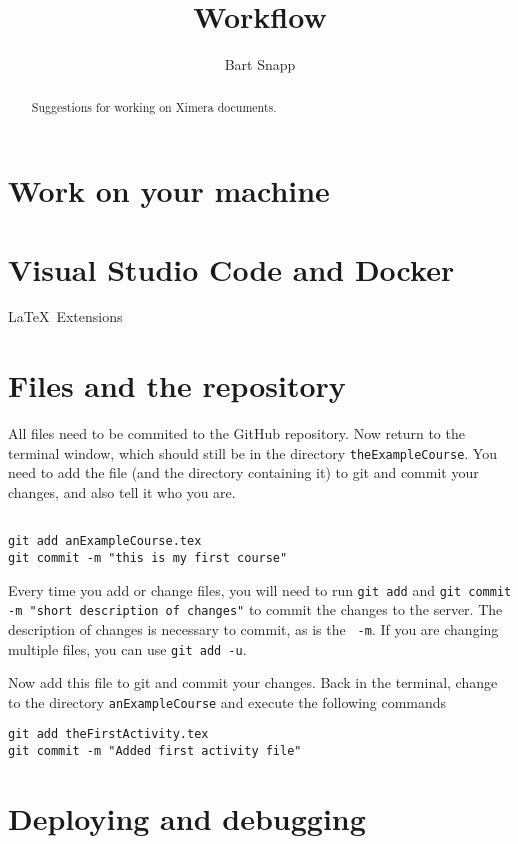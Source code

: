 \documentclass{ximera}
\title{Workflow}
\author{Bart Snapp}
\begin{document}
\begin{abstract}
    Suggestions for working on Ximera documents.
\end{abstract}
\maketitle

\section{Work on your machine}



\section{Visual Studio Code and Docker}

\LaTeX\ Extensions



\section{Files and the repository}

All files need to be commited to the GitHub repository.
Now return to the terminal window, which should still be in the
directory
\verb!theExampleCourse!. You need to add the file (and the directory
containing
it) to git and commit your changes, and also tell it who you are.
\begin{verbatim}

git add anExampleCourse.tex
git commit -m "this is my first course"
\end{verbatim}

Every time you add or change files, you will need to run \verb!git add!
and
\verb!git commit -m "short description of changes"! to commit the
changes to
the server. The description of changes is necessary to commit, as is
the
\verb! -m!. If you are changing multiple files, you can use
\verb!git add -u!.



Now add this file to git and commit your changes. Back in the terminal,
change to the directory \verb!anExampleCourse!
and execute the following commands
\begin{verbatim}
git add theFirstActivity.tex
git commit -m "Added first activity file"
\end{verbatim}


\section{Deploying and debugging}
\end{document}
